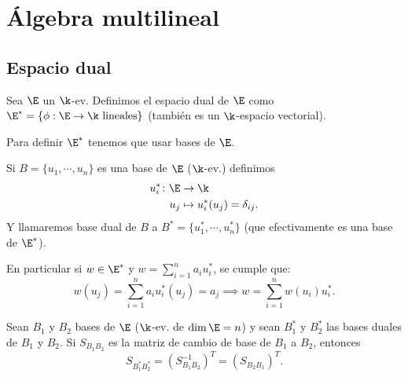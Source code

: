 
\chapter{Álgebra multilineal}


\section{Espacio dual}

\begin{defi}
    Sea $ \E $ un $ \k $-ev.  Definimos el espacio dual de $ \E $ como $
    \E^* = \{ \phi :  \E \to \k \text{ lineales} \} $ (también es un $
    \k $-espacio vectorial).
\end{defi}
\begin{obs}
    Para definir $ \E^* $ tenemos que usar bases de $ \E $.
\end{obs}
\begin{defi}
    Si $ B = \{ u_1,\cdots, u_n \} $ es una base de $ \E $ ($ \k $-ev.)
    definimos
    \[
        \begin{aligned}
            u_i^* \colon \E &\to \k\\
            u_j &\mapsto u_i^*(u_j) = \delta_{ij}.
        \end{aligned}
    \]
    Y llamaremos base dual de $ B $ a $ B^* = \{ u_1^*, \cdots, u_n^* \}
    $ (que efectivamente es una base de $ \E^* $).
\end{defi}
\begin{obs}
    En particular si $ w \in \E^* $ y $ \displaystyle w = \sum_{i=1}^{n}
    a_i u_i^* $, se cumple que:
    \[
        w(u_j) = \sum_{i=1}^{n} a_i u_i^*(u_j) = a_j \implies w = \sum_{i=1}^
        {n}w(u_i)u_i^*.
    \]
\end{obs}

\begin{prop}
    Sean $ B_1 $ y $ B_2 $ bases de $ \E $ ($ \k $-ev.  de $ \dim \E = n
    $) y sean $ B_1^* $ y $ B_2^* $ las bases duales de $ B_1 $ y $ B_2 $.
    Si $ S_{B_1B_2} $ es la matriz de cambio de base de $ B_1 $ a $ B_2 $,
    entonces
    \[
        S_{B_1^*B_2^*} = (S_{B_1B_2}^{-1})^T = (S_{B_2B_1})^T.
    \]
\end{prop}

